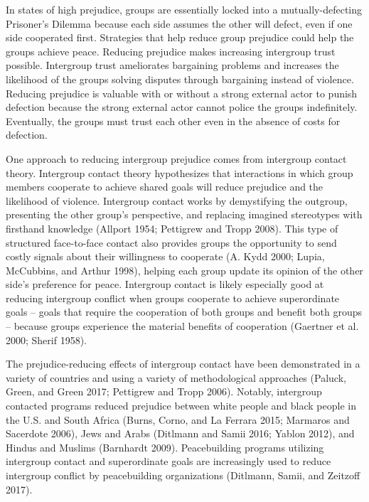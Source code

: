 \documentclass[11pt]{article}
\begin{document}
In states of high prejudice, groups are essentially locked into a
mutually-defecting Prisoner's Dilemma because each side assumes the
other will defect, even if one side cooperated first. Strategies that
help reduce group prejudice could help the groups achieve peace.
Reducing prejudice makes increasing intergroup trust possible.
Intergroup trust ameliorates bargaining problems and increases the
likelihood of the groups solving disputes through bargaining instead of
violence. Reducing prejudice is valuable with or without a strong
external actor to punish defection because the strong external actor
cannot police the groups indefinitely. Eventually, the groups must trust
each other even in the absence of costs for defection.

One approach to reducing intergroup prejudice comes from intergroup
contact theory. Intergroup contact theory hypothesizes that interactions
in which group members cooperate to achieve shared goals will reduce
prejudice and the likelihood of violence. Intergroup contact works by
demystifying the outgroup, presenting the other group's perspective, and
replacing imagined stereotypes with firsthand knowledge (Allport 1954;
Pettigrew and Tropp 2008). This type of structured face-to-face contact
also provides groups the opportunity to send costly signals about their
willingness to cooperate (A. Kydd 2000; Lupia, McCubbins, and Arthur
1998), helping each group update its opinion of the other side's
preference for peace. Intergroup contact is likely especially good at
reducing intergroup conflict when groups cooperate to achieve
superordinate goals -- goals that require the cooperation of both groups
and benefit both groups -- because groups experience the material
benefits of cooperation (Gaertner et al. 2000; Sherif 1958).

The prejudice-reducing effects of intergroup contact have been
demonstrated in a variety of countries and using a variety of
methodological approaches (Paluck, Green, and Green 2017; Pettigrew and
Tropp 2006). Notably, intergroup contacted programs reduced prejudice
between white people and black people in the U.S. and South Africa
(Burns, Corno, and La Ferrara 2015; Marmaros and Sacerdote 2006), Jews
and Arabs (Ditlmann and Samii 2016; Yablon 2012), and Hindus and Muslims
(Barnhardt 2009). Peacebuilding programs utilizing intergroup contact
and superordinate goals are increasingly used to reduce intergroup
conflict by peacebuilding organizations (Ditlmann, Samii, and Zeitzoff
2017).
\end{document}
